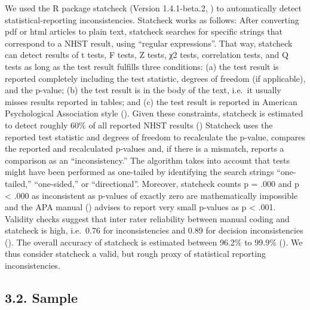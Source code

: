 \documentclass[
  doc,
  longtable,
  nolmodern,
  notxfonts,
  notimes,
  colorlinks=true,linkcolor=blue,citecolor=blue,urlcolor=blue]{apa7}
\begin{document}
We used the R package statcheck (Version 1.4.1-beta.2,
) to
automatically detect statistical-reporting inconsistencies. Statcheck
works as follows: After converting pdf or html articles to plain text,
statcheck searches for specific strings that correspond to a NHST
result, using ``regular expressions''. That way, statcheck can detect
results of t tests, F tests, Z tests, χ2 tests, correlation tests, and Q
tests as long as the test result fulfills three conditions: (a) the test
result is reported completely including the test statistic, degrees of
freedom (if applicable), and the p-value; (b) the test result is in the
body of the text, i.e.~it usually misses results reported in tables; and
(c) the test result is reported in American Psychological Association
style (). Given these constraints, statcheck is estimated to detect
roughly 60\% of all reported NHST results
() Statcheck
uses the reported test statistic and degrees of freedom to recalculate
the p-value, compares the reported and recalculated p-values and, if
there is a mismatch, reports a comparison as an ``inconsistency.'' The
algorithm takes into account that tests might have been performed as
one-tailed by identifying the search strings ``one-tailed,''
``one-sided,'' or ``directional''. Moreover, statcheck counts p = .000
and p \textless{} .000 as inconsistent as p-values of exactly zero are
mathematically impossible and the APA manual
()
advises to report very small p-values as p \textless{} .001. Validity
checks suggest that inter rater reliability between manual coding and
statcheck is high, i.e.~0.76 for inconsistencies and 0.89 for decision
inconsistencies (). The overall accuracy of statcheck is estimated between 96.2\% to
99.9\% (). We
thus consider statcheck a valid, but rough proxy of statistical
reporting inconsistencies.

\subsection{3.2. Sample}\label{sample}
\end{document}
